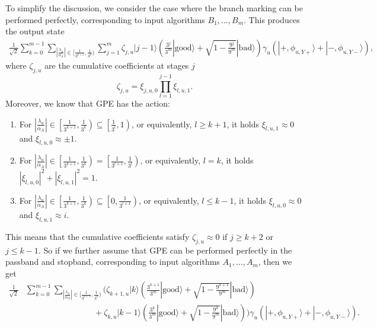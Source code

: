 \documentclass[letterpaper,onecolumn,11pt,accepted=2026-02-14]{quantumarticle}
\newcommand{\abs}[1]{\left\lvert#1\right\rvert}
\theoremstyle{remark}
\theoremstyle{plain}
\newcommand{\ket}[1]{|#1\rangle}
\begin{document}
To simplify the discussion, we consider the case where the branch marking can be performed perfectly, corresponding to input algorithms $B_1,\ldots,B_m$. This produces the output state
\begin{equation}
\begin{aligned}
    \frac{1}{\sqrt{2}}\sum_{k=0}^{m-1}\sum_{\abs{\frac{\lambda_u}{\alpha_A}}\in\big[\frac{1}{3^{k+1}},\frac{1}{3^k}\big)}
    \sum_{j=1}^m
    \zeta_{j,u}
    \ket{j-1}\left(\frac{3^{j}}{3^m}\ket{\mathrm{good}}+\sqrt{1-\frac{9^{j}}{9^m}}\ket{\mathrm{bad}}\right)
    \gamma_u\left(\ket{+,\phi_{u,Y+}}+\ket{-,\phi_{u,Y-}}\right),
\end{aligned}
\end{equation}
where $\zeta_{j,u}$ are the cumulative coefficients at stages $j$
\begin{equation}
    \zeta_{j,u}=\xi_{j,u,0}\prod_{l=1}^{j-1}\xi_{l,u,1}.
\end{equation}
Moreover, we know that GPE has the action:
\begin{enumerate}[label=(\roman*)]
    \item For $\abs{\frac{\lambda_u}{\alpha_A}}\in\left[\frac{1}{3^{k+1}},\frac{1}{3^k}\right)\subseteq\left[\frac{1}{3^{l}},1\right)$, or equivalently, $l\geq k+1$, it holds $\xi_{l,u,1}\approx0$ and $\xi_{l,u,0}\approx\pm1$.
\addtocounter{equation}{1}%
    \item For $\abs{\frac{\lambda_u}{\alpha_A}}\in\left[\frac{1}{3^{k+1}},\frac{1}{3^k}\right)=\left[\frac{1}{3^{l+1}},\frac{1}{3^l}\right)$, or equivalently, $l=k$, it holds $\abs{\xi_{l,u,0}}^2+
        \abs{\xi_{l,u,1}}^2=1$.
\addtocounter{equation}{1}%
    \item For $\abs{\frac{\lambda_u}{\alpha_A}}\in\left[\frac{1}{3^{k+1}},\frac{1}{3^k}\right)\subseteq\left[0,\frac{1}{3^{l+1}}\right)$, or equivalently, $l\leq k-1$, it holds $\xi_{l,u,0}\approx0$ and $\xi_{l,u,1}\approx i$.
\addtocounter{equation}{1}%
\end{enumerate}
This means that the cumulative coefficients satisfy $\zeta_{j,u}\approx 0$ if $j\geq k+2$ or $j\leq k-1$.
So if we further assume that GPE can be performed perfectly in the passband and stopband, corresponding to input algorithms $A_1,\ldots,A_m$, then we get
\begin{equation}
\label{eq:gpe_with_bm}
\begin{aligned}
    \frac{1}{\sqrt{2}}&\sum_{k=0}^{m-1}\sum_{\abs{\frac{\lambda_u}{\alpha_A}}\in\big[\frac{1}{3^{k+1}},\frac{1}{3^k}\big)}
    \Bigg(\zeta_{k+1,u}
    \ket{k}\left(\frac{3^{k+1}}{3^m}\ket{\mathrm{good}}+\sqrt{1-\frac{9^{k+1}}{9^m}}\ket{\mathrm{bad}}\right)\\
    &\qquad\qquad\qquad\qquad\
    +\zeta_{k,u}
    \ket{k-1}\left(\frac{3^{k}}{3^m}\ket{\mathrm{good}}+\sqrt{1-\frac{9^{k}}{9^m}}\ket{\mathrm{bad}}\right)\Bigg)
    \gamma_u\left(\ket{+,\phi_{u,Y+}}+\ket{-,\phi_{u,Y-}}\right).
\end{aligned}
\end{equation}
\end{document}
